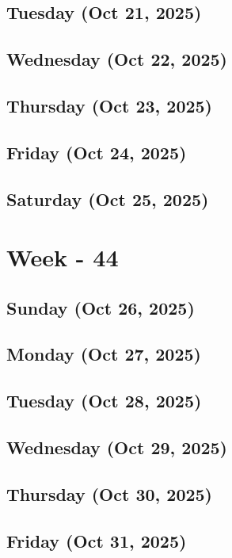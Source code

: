 \subsection*{Tuesday (Oct 21, 2025)}
\subsection*{Wednesday (Oct 22, 2025)}
\subsection*{Thursday (Oct 23, 2025)}
\subsection*{Friday (Oct 24, 2025)}
\subsection*{Saturday (Oct 25, 2025)}

\section{Week - 44}
\subsection*{Sunday (Oct 26, 2025)}
\subsection*{Monday (Oct 27, 2025)}
\subsection*{Tuesday (Oct 28, 2025)}
\subsection*{Wednesday (Oct 29, 2025)}
\subsection*{Thursday (Oct 30, 2025)}
\subsection*{Friday (Oct 31, 2025)}

\newpage
\begin{spacing}{1.0}
\renewcommand{\bibname}{\bf{References}}


\end{spacing}